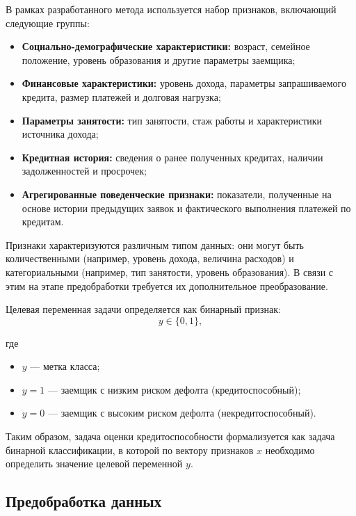 В рамках разработанного метода используется набор признаков, включающий следующие группы:

\begin{itemize}
  \item \textbf{Социально-демографические характеристики:} возраст, семейное положение, уровень образования и другие параметры заемщика;

  \item \textbf{Финансовые характеристики:} уровень дохода, параметры запрашиваемого кредита, размер платежей и долговая нагрузка;

  \item \textbf{Параметры занятости:} тип занятости, стаж работы и характеристики источника дохода;

  \item \textbf{Кредитная история:} сведения о ранее полученных кредитах, наличии задолженностей и просрочек;

  \item \textbf{Агрегированные поведенческие признаки:} показатели, полученные на основе истории предыдущих заявок и фактического выполнения платежей по кредитам.
\end{itemize}

Признаки характеризуются различным типом данных: они могут быть количественными (например, уровень дохода, величина расходов) и категориальными (например, тип занятости, уровень образования). В связи с этим на этапе предобработки требуется их дополнительное преобразование.

Целевая переменная задачи определяется как бинарный признак:
\begin{equation}
  y \in \{0, 1\},
\end{equation}

где

\begin{itemize}
  \item $y$ --- метка класса;
  \item $y = 1$ --- заемщик с низким риском дефолта (кредитоспособный);
  \item $y = 0$ --- заемщик с высоким риском дефолта (некредитоспособный).
\end{itemize}


Таким образом, задача оценки кредитоспособности формализуется как задача бинарной классификации, в которой по вектору признаков $x$ необходимо определить значение целевой переменной $y$.


\subsection{Предобработка данных}

